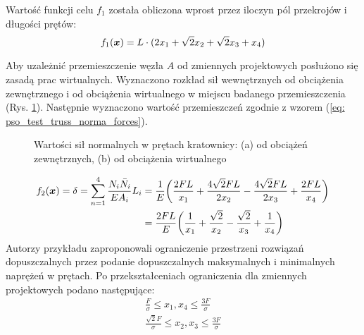 Wartość funkcji celu $f_1$ została obliczona wprost przez iloczyn pól przekrojów i długości prętów:
\begin{equation}
	f_1(\bm{x}) = L\cdot(2x_1+\sqrt{2}x_2+\sqrt{2}x_3+x_4)
\end{equation}

Aby uzależnić przemieszczenie węzła $A$ od zmiennych projektowych posłużono się zasadą prac wirtualnych. Wyznaczono rozkład sił wewnętrznych od obciążenia zewnętrznego i od obciążenia wirtualnego w miejscu badanego przemieszczenia (Rys. \ref{fig: pso_testtruss_results}). Następnie wyznaczono wartość przemieszczeń zgodnie z wzorem (\ref{eq: pso_test_truss_norma_forces}).
\begin{figure}[hbt!]
	\centering
	\captionsetup{justification=centering}
	\caption{Wartości sił normalnych w prętach kratownicy: (a) od obciążeń zewnętrznych, (b) od obciążenia wirtualnego}
	\label{fig: pso_testtruss_results}
\end{figure}
\begin{equation} \label{eq: pso_test_truss_norma_forces}
\begin{split}
	f_2(\bm{x}) =\delta= \sum_{n=1}^{4} \frac{N_i\bar{N}_i}{EA_i}L_i &=\frac{1}{E}\bigg(\frac{2FL}{x_1}+ \frac{4\sqrt{2}FL}{2x_2}- \frac{4\sqrt{2}FL}{2x_3}+\frac{2FL}{x_4}\bigg) \\
	&=\frac{2FL}{E}\bigg(\frac{1}{x_1}+\frac{\sqrt{2}}{x_2}-\frac{\sqrt{2}}{x_3}+\frac{1}{x_4}\bigg)
\end{split}
\end{equation}
Autorzy przykładu zaproponowali ograniczenie przestrzeni rozwiązań dopuszczalnych przez podanie dopuszczalnych maksymalnych i minimalnych naprężeń w prętach. Po przekształceniach ograniczenia dla zmiennych projektowych podano następujące:
\begin{equation}
	\begin{split}
	\frac{F}{\sigma} \le x_1,x_4 \le \frac{3F}{\sigma}\\
	\frac{\sqrt{2}F}{\sigma} \le x_2,x_3 \le \frac{3F}{\sigma}
	\end{split}
\end{equation}

